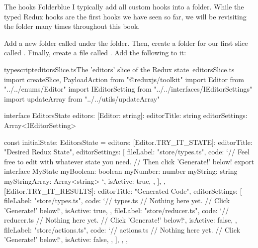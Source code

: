 \documentclass[paper=6in:9in,pagesize=pdftex,headinclude=on,footinclude=on,12pt,twoside]{scrbook}
\begin{document}
\begin{highlightBox}{The hooks Folder}{blue}{\information}
I typically add all custom hooks into a  folder. While the typed Redux hooks are the first hooks we have seen so far, we will be revisiting the  folder many times throughout this book.
\end{highlightBox}


Add a new folder called  under the  folder. Then, create a folder for our first slice called . Finally, create a file called . Add the following to it:

\begin{codeInput}{typescript}{editorsSlice.ts}{The 'editors' slice of the Redux state\, editorsSlice.ts}
import { createSlice, PayloadAction } from "@reduxjs/toolkit"
import Editor from "../../enums/Editor"
import IEditorSetting from "../../interfaces/IEditorSettings"
import { updateArray } from "../../utils/updateArray"

interface EditorsState {
  editors: {
    [Editor: string]: {
      editorTitle: string
      editorSettings: Array<IEditorSetting>
    }
  }
}

const initialState: EditorsState = {
  editors: {
    [Editor.TRY_IT_STATE]: {
      editorTitle: "Desired Redux State",
      editorSettings: [
        {
          fileLabel: "store/types.ts",
          code: `// Feel free to edit with whatever state you need.
// Then click 'Generate!' below!
export interface MyState {
  myBoolean: boolean
  myNumber: number
  myString: string
  myStringArray: Array<string>
}`,
          isActive: true,
        },
      ],
    },
    [Editor.TRY_IT_RESULTS]: {
      editorTitle: "Generated Code",
      editorSettings: [
        {
          fileLabel: "store/types.ts",
          code: `// types.ts
// Nothing here yet.
// Click 'Generate!' below!`,
          isActive: true,
        },
        {
          fileLabel: "store/reducer.ts",
          code: `// reducer.ts
// Nothing here yet.
// Click 'Generate!' below!`,
          isActive: false,
        },
        {
          fileLabel: "store/actions.ts",
          code: `// actions.ts
// Nothing here yet.
// Click 'Generate!' below!`,
          isActive: false,
        },
      ],
    },
  },
}


\end{codeInput}
\end{document}
